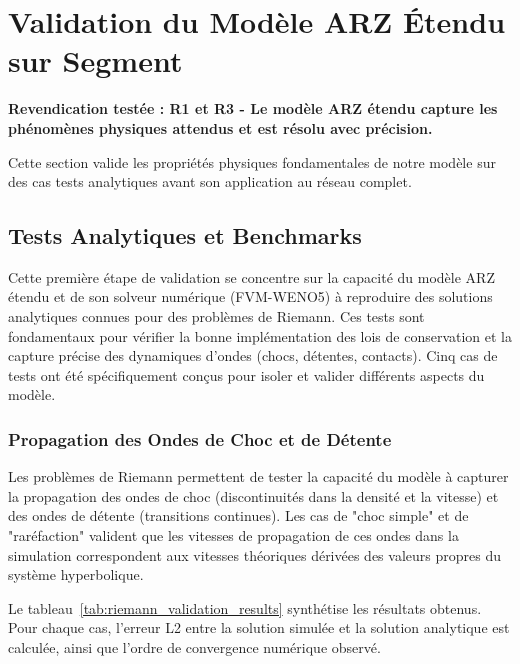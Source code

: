 
\section{Validation du Modèle ARZ Étendu sur Segment}
\label{sec:validation_arz_segment}

\textbf{Revendication testée : R1 et R3 - Le modèle ARZ étendu capture les phénomènes physiques attendus et est résolu avec précision.}

Cette section valide les propriétés physiques fondamentales de notre modèle sur des cas tests analytiques avant son application au réseau complet.

\subsection{Tests Analytiques et Benchmarks}
\label{subsec:tests_analytiques}

Cette première étape de validation se concentre sur la capacité du modèle ARZ étendu et de son solveur numérique (FVM-WENO5) à reproduire des solutions analytiques connues pour des problèmes de Riemann. Ces tests sont fondamentaux pour vérifier la bonne implémentation des lois de conservation et la capture précise des dynamiques d'ondes (chocs, détentes, contacts). Cinq cas de tests ont été spécifiquement conçus pour isoler et valider différents aspects du modèle.

\subsubsection{Propagation des Ondes de Choc et de Détente}

Les problèmes de Riemann permettent de tester la capacité du modèle à capturer la propagation des ondes de choc (discontinuités dans la densité et la vitesse) et des ondes de détente (transitions continues). Les cas de "choc simple" et de "raréfaction" valident que les vitesses de propagation de ces ondes dans la simulation correspondent aux vitesses théoriques dérivées des valeurs propres du système hyperbolique.

Le tableau~\ref{tab:riemann_validation_results} synthétise les résultats obtenus. Pour chaque cas, l'erreur L2 entre la solution simulée et la solution analytique est calculée, ainsi que l'ordre de convergence numérique observé.

